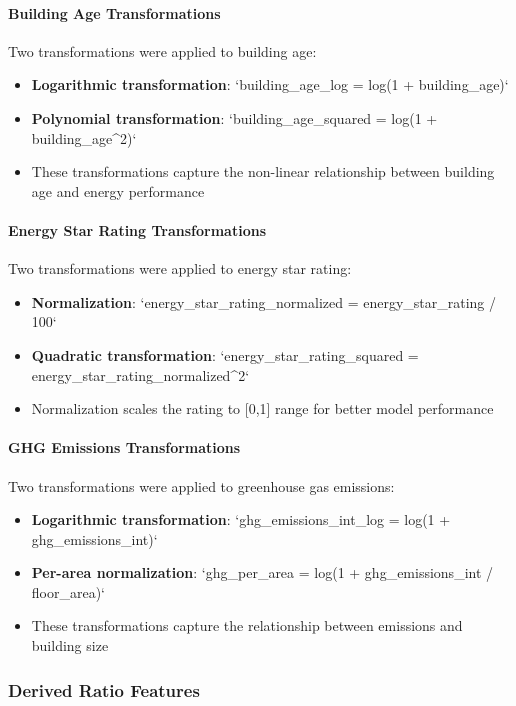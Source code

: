 \paragraph{Building Age Transformations}
Two transformations were applied to building age:
\begin{itemize}
    \item \textbf{Logarithmic transformation}: `building\_age\_log = log(1 + building\_age)`
    \item \textbf{Polynomial transformation}: `building\_age\_squared = log(1 + building\_age^2)`
    \item These transformations capture the non-linear relationship between building age and energy performance
\end{itemize}

\paragraph{Energy Star Rating Transformations}
Two transformations were applied to energy star rating:
\begin{itemize}
    \item \textbf{Normalization}: `energy\_star\_rating\_normalized = energy\_star\_rating / 100`
    \item \textbf{Quadratic transformation}: `energy\_star\_rating\_squared = energy\_star\_rating\_normalized^2`
    \item Normalization scales the rating to [0,1] range for better model performance
\end{itemize}

\paragraph{GHG Emissions Transformations}
Two transformations were applied to greenhouse gas emissions:
\begin{itemize}
    \item \textbf{Logarithmic transformation}: `ghg\_emissions\_int\_log = log(1 + ghg\_emissions\_int)`
    \item \textbf{Per-area normalization}: `ghg\_per\_area = log(1 + ghg\_emissions\_int / floor\_area)`
    \item These transformations capture the relationship between emissions and building size
\end{itemize}

\subsubsection{Derived Ratio Features}


